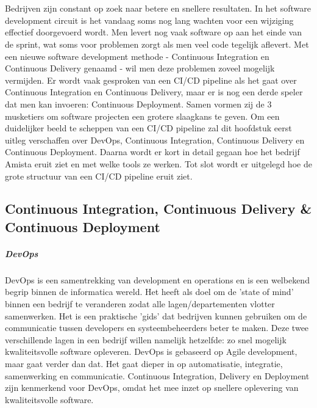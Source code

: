 \chapter{}
\label{ch:stand-van-zaken}

Bedrijven zijn constant op zoek naar betere en snellere resultaten. In het software development circuit is het vandaag soms nog lang wachten voor een wijziging effectief doorgevoerd wordt. Men levert nog vaak software op aan het einde van de sprint, wat soms voor problemen zorgt als men veel code tegelijk aflevert. Met een nieuwe software development methode - Continuous Integration en Continuous Delivery genaamd - wil men deze problemen zoveel mogelijk vermijden. Er wordt vaak gesproken van een CI/CD pipeline als het gaat over Continuous Integration en Continuous Delivery, maar er is nog een derde speler dat men kan invoeren: Continuous Deployment. Samen vormen zij de 3 musketiers om software projecten een grotere slaagkans te geven.
Om een duidelijker beeld te scheppen van een CI/CD pipeline zal dit hoofdstuk eerst uitleg verschaffen over DevOps, Continuous Integration, Continuous Delivery en Continuous Deployment. Daarna wordt er kort in detail gegaan hoe het bedrijf Amista eruit ziet en met welke tools ze werken. Tot slot wordt er uitgelegd hoe de grote structuur van een CI/CD pipeline eruit ziet.


\section{Continuous Integration, Continuous Delivery \& Continuous Deployment}
\label{sec:continuous-integration-continuous-delivery-continuous-deployment}
    \paragraph{DevOps}
    DevOps is een samentrekking van development en operations en is een welbekend begrip binnen de informatica wereld. Het heeft als doel om de 'state of mind' binnen een bedrijf te veranderen zodat alle lagen/departementen vlotter samenwerken. Het is een praktische 'gids' dat bedrijven kunnen gebruiken om de communicatie tussen developers en systeembeheerders beter te maken. Deze twee verschillende lagen in een bedrijf willen namelijk hetzelfde: zo snel mogelijk kwaliteitsvolle software opleveren. DevOps is gebaseerd op Agile development, maar gaat verder dan dat. Het gaat dieper in op automatisatie, integratie, samenwerking en communicatie. 
    Continuous Integration, Delivery en Deployment zijn kenmerkend voor DevOps, omdat het mee inzet op snellere oplevering van kwaliteitsvolle software. ~\autocite{Riti2018}
    
